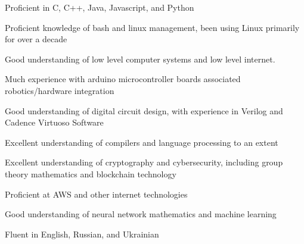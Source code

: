 

\begin{cvparagraph}

\;
    \begin{cvitems}
        \item Proficient in C, C++, Java, Javascript, and Python
        \item Proficient knowledge of bash and linux management, been using Linux primarily for over a decade
        \item Good understanding of low level computer systems and low level internet.
        \item Much experience with arduino microcontroller boards associated robotics/hardware integration
        \item Good understanding of digital circuit design, with experience in Verilog and Cadence Virtuoso Software
        \item Excellent understanding of compilers and language processing to an extent
        \item Excellent understanding of cryptography and cybersecurity, including group theory mathematics and blockchain technology
        \item Proficient at AWS and other internet technologies
        \item Good understanding of neural network mathematics and machine learning
        \item Fluent in English, Russian, and Ukrainian
    \end{cvitems}
\end{cvparagraph}
